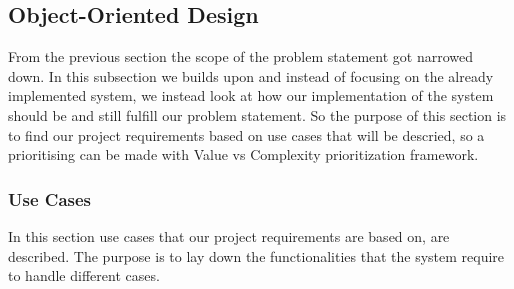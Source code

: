 \subsection{Object-Oriented Design}

From the previous section the scope of the problem statement got narrowed down. In this subsection we builds upon and instead of focusing on the already implemented system, we instead look at how our implementation of the system should be and still fulfill our problem statement. So the purpose of this section is to find our project requirements based on use cases that will be descried, so a prioritising can be made with Value vs Complexity prioritization framework.




\subsubsection{Use Cases}
In this section use cases that our project requirements are based on, are described. The purpose is to lay down the functionalities that the system require to handle different cases. 


